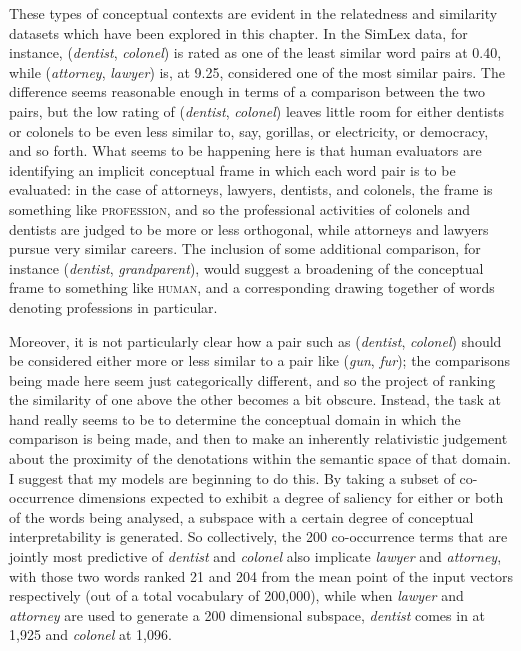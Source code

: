 These types of conceptual contexts are evident in the relatedness and similarity datasets which have been explored in this chapter.  In the SimLex data, for instance, (\emph{dentist}, \emph{colonel}) is rated as one of the least similar word pairs at 0.40, while (\emph{attorney}, \emph{lawyer}) is, at 9.25, considered one of the most similar pairs.  The difference seems reasonable enough in terms of a comparison between the two pairs, but the low rating of (\emph{dentist}, \emph{colonel}) leaves little room for either dentists or colonels to be even less similar to, say, gorillas, or electricity, or democracy, and so forth.  What seems to be happening here is that human evaluators are identifying an implicit conceptual frame in which each word pair is to be evaluated: in the case of attorneys, lawyers, dentists, and colonels, the frame is something like \textsc{profession}, and so the professional activities of colonels and dentists are judged to be more or less orthogonal, while attorneys and lawyers pursue very similar careers.  The inclusion of some additional comparison, for instance (\emph{dentist}, \emph{grandparent}), would suggest a broadening of the conceptual frame to something like \textsc{human}, and a corresponding drawing together of words denoting professions in particular.

Moreover, it is not particularly clear how a pair such as (\emph{dentist}, \emph{colonel}) should be considered either more or less similar to a pair like (\emph{gun}, \emph{fur}); the comparisons being made here seem just categorically different, and so the project of ranking the similarity of one above the other becomes a bit obscure.  Instead, the task at hand really seems to be to determine the conceptual domain in which the comparison is being made, and then to make an inherently relativistic judgement about the proximity of the denotations within the semantic space of that domain.  I suggest that my models are beginning to do this.  By taking a subset of co-occurrence dimensions expected to exhibit a degree of saliency for either or both of the words being analysed, a subspace with a certain degree of conceptual interpretability is generated.  So collectively, the 200 co-occurrence terms that are jointly most predictive of \emph{dentist} and \emph{colonel} also implicate \emph{lawyer} and \emph{attorney}, with those two words ranked 21 and 204 from the mean point of the input vectors respectively (out of a total vocabulary of 200,000), while when \emph{lawyer} and \emph{attorney} are used to generate a 200 dimensional subspace, \emph{dentist} comes in at 1,925 and \emph{colonel} at 1,096.

